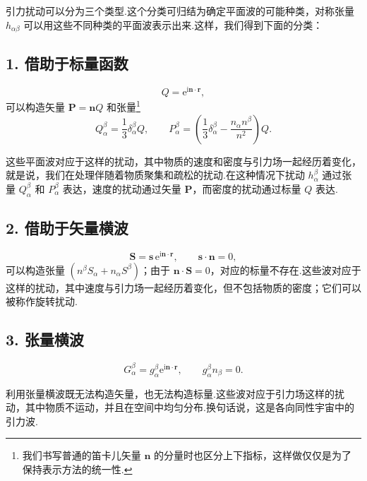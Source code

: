 引力扰动可以分为三个类型.这个分类可归结为确定平面波的可能种类，对称张量 $h_{\alpha\beta}$ 可以用这些不同种类的平面波表示出来.这样，我们得到下面的分类：

\subsection*{1. 借助于标量函数}
\begin{equation}
  Q=\mathrm{e}^{\mathrm{i}\boldsymbol{n}\cdot\boldsymbol{r}},
\end{equation}
可以构造矢量 $\boldsymbol{P}=\boldsymbol{n}Q$ 和张量\footnote{我们书写普通的笛卡儿矢量 $\boldsymbol{n}$ 的分量时也区分上下指标，这样做仅仅是为了保持表示方法的统一性.}
\begin{equation}
  Q_{\alpha}^{\beta}=\frac{1}{3}\delta_{\alpha}^{\beta}Q,\qquad
  P_{\alpha}^{\beta}
  =\left(\frac{1}{3}\delta_{\alpha}^{\beta}
  -\frac{n_{\alpha}n^{\beta}}{n^{2}}\right)Q.
\end{equation}

这些平面波对应于这样的扰动，其中物质的速度和密度与引力场一起经历着变化，就是说，我们在处理伴随着物质聚集和疏松的扰动.在这种情况下扰动 $h_{\alpha}^{\beta}$ 通过张量 $Q_{\alpha}^{\beta}$ 和 $P_{\alpha}^{\beta}$ 表达，速度的扰动通过矢量 $\boldsymbol{P}$，而密度的扰动通过标量 $Q$ 表达.

\subsection*{2. 借助于矢量横波}
\begin{equation}
  \boldsymbol{S}=\boldsymbol{s}\,\mathrm{e}^{\mathrm{i}\boldsymbol{n}\cdot\boldsymbol{r}},
  \qquad
  \boldsymbol{s}\cdot\boldsymbol{n}=0,
\end{equation}
可以构造张量 $(n^{\beta}S_{\alpha}+n_{\alpha}S^{\beta})$；由于 $\boldsymbol{n}\cdot\boldsymbol{S}=0$，对应的标量不存在.这些波对应于这样的扰动，其中速度与引力场一起经历着变化，但不包括物质的密度；它们可以被称作旋转扰动.

\subsection*{3. 张量横波}
\begin{equation}
  G_{\alpha}^{\beta}=g_{\alpha}^{\beta}\mathrm{e}^{\mathrm{i}\boldsymbol{n}\cdot\boldsymbol{r}},
  \qquad
  g_{\alpha}^{\beta}n_{\beta}=0.
\end{equation}

利用张量横波既无法构造矢量，也无法构造标量.这些波对应于引力场这样的扰动，其中物质不运动，并且在空间中均匀分布.换句话说，这是各向同性宇宙中的引力波.

